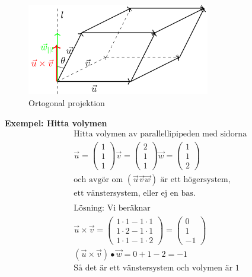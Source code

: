 \begin{multicols}{2}
\begin{figure}[H]
    \centering
    \includegraphics[width=8cm]{image/parallelogram.png} 
    \caption{Ortogonal projektion}
\end{figure}

\textbf{Exempel: Hitta volymen}
\begin{align*} 
  &\quad  \text{Hitta volymen av parallellipipeden med sidorna } \\
  &\quad
  \vec{u} = \begin{pmatrix} 1 \\ 1 \\ 1 \end{pmatrix}
  \vec{v} = \begin{pmatrix} 2 \\ 1 \\ 1 \end{pmatrix}
  \vec{w} = \begin{pmatrix} 1 \\ 1 \\ 2 \end{pmatrix} \\
  &\quad  \text{och avgör om $(\vec{u} \vec{v} \vec{w})$ är ett högersystem,} \\
  &\quad  \text{ett vänstersystem, eller ej en bas.} \\
  &\quad  \\
  &\quad  \text{Lösning: Vi beräknar} \\
  &\quad  \vec{u}\times\vec{v} =
  \begin{pmatrix} 1\cdot{1}-1\cdot{1} \\ 1\cdot{2}-1\cdot{1} \\ 1\cdot{1}-1\cdot{2} \end{pmatrix}
  = \begin{pmatrix} 0 \\ 1 \\ -1 \end{pmatrix} \\
  &\quad  (\vec{u}\times\vec{v})\bullet\vec{w} = 0+1-2=-1 \\
  &\quad  \text{Så det är ett vänstersystem och volymen är 1} \\
\end{align*}



\end{multicols}
